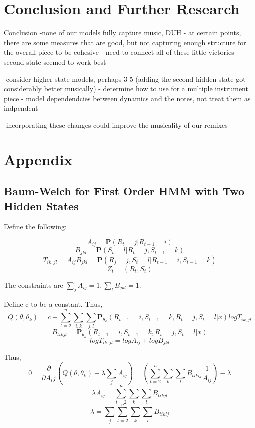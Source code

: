 \documentclass{article} %
\begin{document}
\section{Conclusion and Further Research}

Conclusion 
-none of our models fully capture music, DUH
- at certain points, there are some measures that are good, but not capturing enough structure for the overall piece to be cohesive
- need to connect all of these little victories
-second state seemed to work best 

-consider higher state models, perhaps 3-5 (adding the second hidden state got considerably better musically)
- determine how to use for a multiple instrument piece
- model dependendcies between dynamics and the notes, not treat them as indpendent

-incorporating these changes could improve the musicality of our remixes


\newpage

\section{Appendix}

\subsection{Baum-Welch for First Order HMM with Two Hidden States}

Define the following:

$$A_{ij} = \textbf{P} (R_t = j | R_{t-1} = i)$$
$$B_{jkl} = \textbf{P} (S_t = l | R_t = j, S_{t-1} = k)$$ 
$$T_{ik, jl} = A_{ij} B_{jkl} = \textbf{P} (R_j = j, S_t = l | R_{t-1} = i, S_{t-1} = k)$$
$$Z_t = (R_t, S_t)$$

The constraints are $\sum_j A_{ij} = 1, \sum_l B_{jkl} = 1.$ \newline

Define c to be a constant. Thus,  \newline
$$Q(\theta, \theta_k) = c + \sum_{t=2}^n \sum_{i,k} \sum_{j,l} \textbf{P}_{\theta_k} (R_{t-1} = i, S_{t-1} = k, R_t = j, S_t = l | x) log T_{ik, jl}$$ 
$$B_{tikjl} = \textbf{P}_{\theta_k} (R_{t-1} = i, S_{t-1} = k, R_t = j, S_t = l | x)$$
$$log T_{ik, jl} = log A_{ij} + log B_{jkl}$$

Thus, \newline
$$ 0 = \frac{\partial}{\partial A_ij}(Q(\theta, \theta_k) - \lambda \sum_{j} A_{ij}) = (\sum_{t=2}^n \sum_k \sum_l B_{tiklj} \frac{1}{A_{ij}}) - \lambda$$
$$\lambda A_{ij} = \sum_{t=2}^n \sum_k \sum_l B_{tikjl}$$
$$\lambda = \sum_j \sum_{t=2}^n \sum_k \sum_l B_{tiklj}$$
\end{document}
